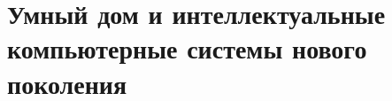 \chapter{Умный дом и интеллектуальные компьютерные системы нового поколения}
\label{chapter_smart_home}


%